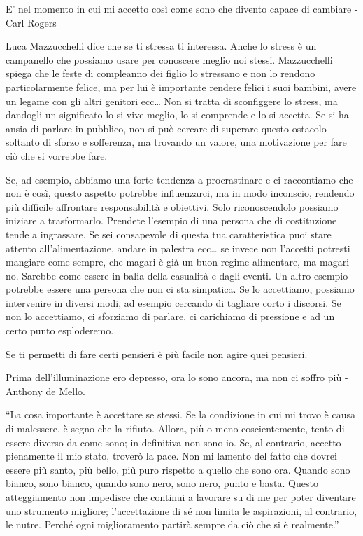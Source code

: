 \documentclass[12pt]{book} %
\begin{document}
E' nel momento in cui mi accetto così come sono che divento capace di cambiare - Carl Rogers

Luca Mazzucchelli dice che se ti stressa ti interessa. Anche lo stress è un campanello che possiamo usare per conoscere
meglio noi stessi. Mazzucchelli spiega che le feste di compleanno dei figlio lo stressano e non lo rendono
particolarmente felice, ma per lui è importante rendere felici i suoi bambini, avere un legame con gli altri genitori
ecc… Non si tratta di sconfiggere lo stress, ma dandogli un significato lo si vive meglio, lo si comprende e lo si
accetta. Se si ha ansia di parlare in pubblico, non si può cercare di superare questo ostacolo soltanto di sforzo e
sofferenza, ma trovando un valore, una motivazione per fare ciò che si vorrebbe fare.

Se, ad esempio, abbiamo una forte tendenza a procrastinare e ci raccontiamo che non è così, questo aspetto potrebbe influenzarci, ma in modo inconscio, rendendo più difficile affrontare responsabilità e obiettivi. Solo riconoscendolo possiamo iniziare a trasformarlo. Prendete l'esempio
di una persona che di costituzione tende a ingrassare. Se sei consapevole di questa tua caratteristica puoi stare
attento all'alimentazione, andare in palestra ecc… se invece non l'accetti potresti mangiare come sempre, che magari è già un buon regime alimentare, ma magari no. Sarebbe come essere in
balia della casualità e dagli eventi. Un altro esempio potrebbe essere una persona che non ci sta simpatica.
Se lo accettiamo, possiamo intervenire in diversi modi, ad esempio cercando di tagliare corto i discorsi. Se non lo
accettiamo, ci sforziamo di parlare, ci carichiamo di pressione e ad un certo punto esploderemo.

Se ti permetti di fare certi pensieri è più facile non agire quei pensieri.

Prima dell'illuminazione ero depresso, ora lo sono ancora, ma non ci soffro più - Anthony de Mello.

“La cosa importante è accettare se stessi. Se la condizione in cui mi trovo è causa di malessere, è segno che la
rifiuto. Allora, più o meno coscientemente, tento di essere diverso da come sono; in definitiva non sono io. Se, al
contrario, accetto pienamente il mio stato, troverò la pace. Non mi lamento del fatto che dovrei essere più santo, più
bello, più puro rispetto a quello che sono ora. Quando sono bianco, sono bianco, quando sono nero, sono nero, punto e
basta. Questo atteggiamento non impedisce che continui a lavorare su di me per poter diventare uno strumento migliore;
l'accettazione di sé non limita le aspirazioni, al contrario, le nutre. Perché ogni miglioramento
partirà sempre da ciò che si è realmente.” 
\end{document}
